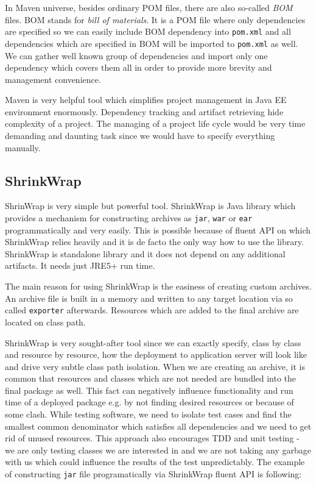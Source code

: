 \documentclass[12pt,final,oneside]{fithesis}
\begin{document}
In Maven universe, besides ordinary POM files, there are also so-called \textit{BOM} files. BOM stands for \textit{bill of materials}. It is a POM file where only dependencies are specified so we can easily include BOM dependency into \texttt{pom.xml} and all dependencies which are specified in BOM will be imported to \texttt{pom.xml} as well. We can gather well known group of dependencies and import only one dependency which covers them all in order to provide more brevity and management convenience.

Maven is very helpful tool which simplifies project management in Java EE environment enormously. Dependency tracking and artifact retrieving hide complexity of a project. The managing of a project life cycle would be very time demanding and daunting task since we would have to specify everything manually. 

	\subsection{ShrinkWrap}\label{shrinkwrap-section}

ShrinWrap\cite{bib030} is very simple but powerful tool. ShrinkWrap is Java library which provides a mechanism for constructing archives as \texttt{jar}, \texttt{war} or \texttt{ear} programmatically and very easily. This is possible because of fluent API\cite{bib031} on which ShrinkWrap relies heavily and it is de facto the only way how to use the library. ShrinkWrap is standalone library and it does not depend on any additional artifacts. It needs just JRE5+ run time.

The main reason for using ShrinkWrap is the easiness of creating custom archives. An archive file is built in a memory and written to any target location via so called \texttt{exporter} afterwards. Resources which are added to the final archive are located on class path.

ShrinkWrap is very sought-after tool since we can exactly specify, class by class and resource by resource, how the deployment to application server will look like and drive very subtle class path isolation. When we are creating an archive, it is common that resources and classes which are not needed are bundled into the final package as well. This fact can negatively influence functionality and run time of a deployed package e.g. by not finding desired resources or because of some clash. While testing software, we need to isolate test cases and find the smallest common denominator which satisfies all dependencies and we need to get rid of unused resources. This approach also encourages TDD and unit testing - we are only testing classes we are interested in and we are not taking any garbage with us which could influence the results of the test unpredictably. The example of constructing \texttt{jar} file programatically via ShrinkWrap fluent API is following:
 
\end{document}
